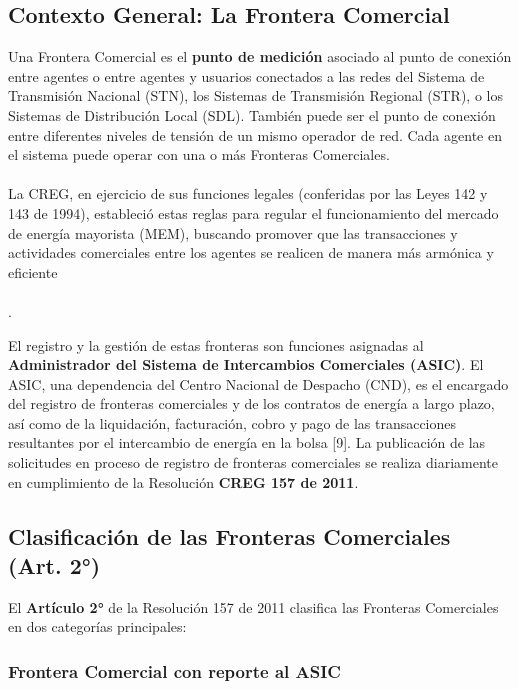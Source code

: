 \documentclass[a5paper]{book}%
\begin{document}
\subsection{Contexto General: La Frontera Comercial}

Una Frontera Comercial es el \textbf{punto de medición} asociado al punto de conexión entre agentes o entre agentes y usuarios conectados a las redes del Sistema de Transmisión Nacional (STN), los Sistemas de Transmisión Regional (STR), o los Sistemas de Distribución Local (SDL). También puede ser el punto de conexión entre diferentes niveles de tensión de un mismo operador de red. Cada agente en el sistema puede operar con una o más Fronteras Comerciales.\\\\

La CREG, en ejercicio de sus funciones legales (conferidas por las Leyes 142 y 143 de 1994), estableció estas reglas para regular el funcionamiento del mercado de energía mayorista (MEM), buscando promover que las transacciones y actividades comerciales entre los agentes se realicen de manera más armónica y eficiente\\\\.

El registro y la gestión de estas fronteras son funciones asignadas al \textbf{Administrador del Sistema de Intercambios Comerciales (ASIC)}. El ASIC, una dependencia del Centro Nacional de Despacho (CND), es el encargado del registro de fronteras comerciales y de los contratos de energía a largo plazo, así como de la liquidación, facturación, cobro y pago de las transacciones resultantes por el intercambio de energía en la bolsa [9]. La publicación de las solicitudes en proceso de registro de fronteras comerciales se realiza diariamente en cumplimiento de la Resolución \textbf{CREG 157 de 2011}.

\subsection{Clasificación de las Fronteras Comerciales (Art. 2°)}

El \textbf{Artículo 2°} de la Resolución 157 de 2011 clasifica las Fronteras Comerciales en dos categorías principales:

\subsubsection{Frontera Comercial con reporte al ASIC}
\end{document}
